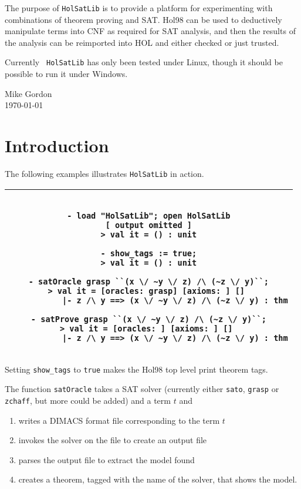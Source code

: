 \documentclass[12pt]{article}
\makeatletter
\renewcommand{\t}[1]{\mbox{\small\tt #1}}
\newcommand\HOL{HOL\xspace}
\newcommand\Hol{Hol98\xspace}
\newlength{\hsbw}
\newcommand\MLSpacing{13pt}
\newenvironment{session}{\begin{flushleft}
 \begin{tabular}{@{}|c@{}|@{}}\hline 
 \begin{minipage}[b]{\hsbw}
 \begingroup\small\baselineskip\MLSpacing}{\endgroup\end{minipage}\\ \hline 
 \end{tabular}
 \end{flushleft}}
\makeatother
\begin{document}
The purpose of {\tt{HolSatLib}} is to provide a platform
for experimenting with combinations of theorem proving and
SAT. Hol98 can be used to deductively manipulate terms into CNF as
required for SAT analysis, and then the results of the analysis
can be reimported into \HOL and either checked or just trusted.

Currently {\tt
HolSatLib} has only been tested under Linux, though it should be
possible to run it under Windows.





\vfill

\begin{flushright}
Mike Gordon\\
\today
\end{flushright}


\newpage

{\baselineskip10pt
\tableofcontents
}

\newpage
{}

\section{Introduction}


The following examples illustrates {\tt{HolSatLib}} in action.

\begin{session}\begin{verbatim}

- load "HolSatLib"; open HolSatLib
[ output omitted ]
> val it = () : unit

- show_tags := true;
> val it = () : unit

- satOracle grasp ``(x \/ ~y \/ z) /\ (~z \/ y)``;
> val it = [oracles: grasp] [axioms: ] [] 
           |- z /\ y ==> (x \/ ~y \/ z) /\ (~z \/ y) : thm

- satProve grasp ``(x \/ ~y \/ z) /\ (~z \/ y)``;
> val it = [oracles: ] [axioms: ] [] 
           |- z /\ y ==> (x \/ ~y \/ z) /\ (~z \/ y) : thm

\end{verbatim}\end{session}

Setting \t{show\_tags} to \t{true} makes the \Hol top
level print theorem tags.

The function \t{satOracle} takes a SAT solver (currently either
\t{sato}, \t{grasp} or \t{zchaff}, but more could be added) and a term
$t$ and

\begin{enumerate}
\item writes a DIMACS format file corresponding to the term $t$
\item invokes the solver on the file to create an output file
\item parses the output file to extract the model found
\item creates a theorem, tagged with the name of the solver, that shows the model.
\end{enumerate}
\end{document}
